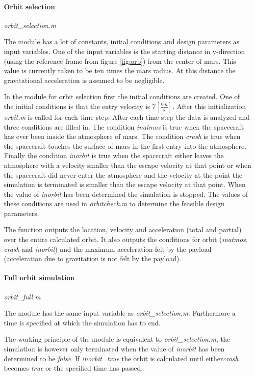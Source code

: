 \paragraph{Orbit selection} \textit{orbit\_selection.m}

The module has a lot of constants, initial conditions and design parameters as input variables. One of the input variables is the starting distance in y-direction (using the reference frame from figure \ref{fig:orb}) from the center of mars. This value is currently taken to be ten times the mars radius. At this distance the gravitational acceleration is assumed to be negligible. 

In the module for orbit selection first the initial conditions are created. One of the initial conditions is that the entry velocity is $7 [\frac{km}{s}]$. After this initialization \textit{orbit.m} is called for each time step. After each time step the data is analyzed and three conditions are filled in. The condition \textit{inatmos} is true when the spacecraft has ever been inside the atmosphere of mars. The condition \textit{crash} is true when the spacecraft touches the surface of mars in the first entry into the atmosphere. Finally the condition \textit{inorbit} is true when the spacecraft either leaves the atmosphere with a velocity smaller than the escape velocity at that point or when the spacecraft did never enter the atmosphere and the velocity at the point the simulation is terminated is smaller than the escape velocity at that point. When the value of \textit{inorbit} has been determined the simulation is stopped. The values of these conditions are used in \textit{orbitcheck.m} to determine the feasible design parameters.

The function outputs the location, velocity and acceleration (total and partial) over the entire calculated orbit. It also outputs the conditions for orbit (\textit{inatmos}, \textit{crash} and \textit{inorbit}) and the maximum acceleration felt by the payload (acceleration due to gravitation is not felt by the payload).

\paragraph{Full orbit simulation} \textit{orbit\_full.m}

The module has the same input variable as \textit{orbit\_selection.m}. Furthermore a time is specified at which the simulation has to end.

The working principle of the module is equivalent to \textit{orbit\_selection.m}, the simulation is however only terminated when the value of \textit{inorbit} has been determined to be \textit{false}. If \textit{inorbit}=\textit{true} the orbit is calculated until either\textit{crash} becomes \textit{true} or the specified time has passed.

